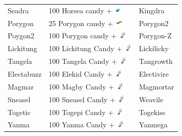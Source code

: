 \begin{table}[ht]
\begin{center}
\begin{tabular}{lll}
    Seadra & 100 Horsea candy + \includegraphics[width=1em,height=1em]{images/dragonscale.png} & Kingdra \\
    Porygon & 25 Porygon candy + \includegraphics[width=1em,height=1em]{images/upgrade.png} & Porygon2 \\
    Poygon2 & 100 Porygon candy + \includegraphics[width=1em,height=1em]{images/sinnohstone.png} & Porygon-Z \\
    Lickitung & 100 Lickitung Candy + \includegraphics[width=1em,height=1em]{images/sinnohstone.png} & Lickilicky \\
    Tangela	& 100 Tangela Candy + \includegraphics[width=1em,height=1em]{images/sinnohstone.png} & Tangrowth \\
    Electabuzz & 100 Elekid Candy + \includegraphics[width=1em,height=1em]{images/sinnohstone.png} & Electivire	\\
    Magmar & 100 Magby Candy + \includegraphics[width=1em,height=1em]{images/sinnohstone.png} & Magmortar	\\
    Sneasel & 100 Sneasel Candy + \includegraphics[width=1em,height=1em]{images/sinnohstone.png} & Weavile	\\
    Togetic & 100 Togepi Candy + \includegraphics[width=1em,height=1em]{images/sinnohstone.png} & Togekiss	\\
    Yanma & 100 Yanma Candy + \includegraphics[width=1em,height=1em]{images/sinnohstone.png} & Yanmega	\\

\end{tabular}
\end{center}
\end{table}
